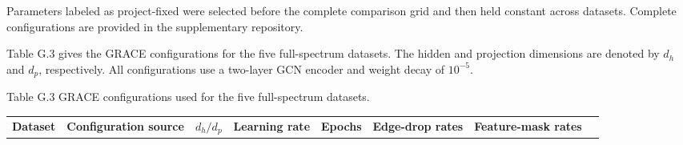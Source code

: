 Parameters labeled as project-fixed were selected before the complete comparison grid and then held constant across datasets. Complete configurations are provided in the supplementary repository.

Table G.3 gives the GRACE configurations for the five full-spectrum datasets. The hidden and projection dimensions are denoted by \(d_{h}\) and \(d_{p}\), respectively. All configurations use a two-layer GCN encoder and weight decay of \(10^{- 5}\).

Table G.3 GRACE configurations used for the five full-spectrum datasets.

{\def\LTcaptype{none} %
\begin{longtable}[]{@{}
  >{\raggedright\arraybackslash}p{}
  >{\centering\arraybackslash}p{}
  >{\centering\arraybackslash}p{}
  >{\centering\arraybackslash}p{}
  >{\centering\arraybackslash}p{}
  >{\centering\arraybackslash}p{}
  >{\centering\arraybackslash}p{}
  >{\centering\arraybackslash}p{}@{}}
\toprule\noalign{}
\begin{minipage}[b]{\linewidth}\raggedright
\textbf{Dataset}
\end{minipage} & \begin{minipage}[b]{\linewidth}\centering
\textbf{Configuration source}
\end{minipage} & \begin{minipage}[b]{\linewidth}\centering
\(d_{h}/d_{p}\)\textbf{\hspace{0pt}}
\end{minipage} & \begin{minipage}[b]{\linewidth}\centering
\textbf{Learning rate}
\end{minipage} & \begin{minipage}[b]{\linewidth}\centering
\textbf{Epochs}
\end{minipage} & \begin{minipage}[b]{\linewidth}\centering
\textbf{Edge-drop rates}
\end{minipage} & \begin{minipage}[b]{\linewidth}\centering
\textbf{Feature-mask rates}
\end{minipage} & \begin{minipage}[b]{\linewidth}\centering

\end{minipage}
\end{longtable}}
